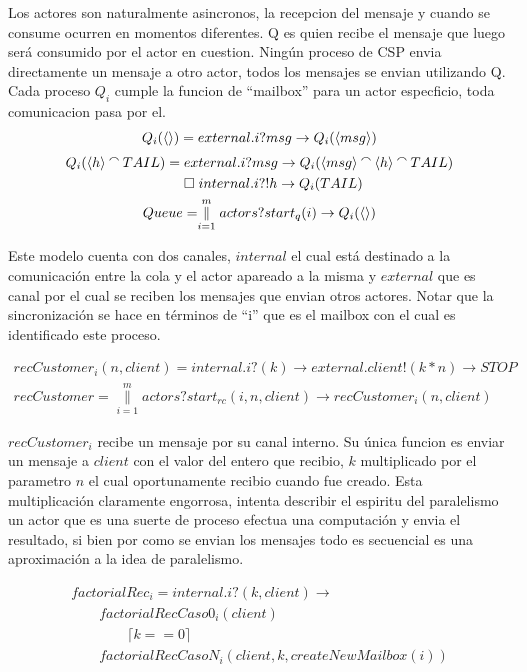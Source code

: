 \documentclass[fleqn]{article}
\newcommand{\myList}[1]{\langle #1 \rangle}
\newcommand{\myCons}[0]{\mathbin{\raise 0.8ex\hbox{$\smallfrown$}}}
\newcommand{\paralleln}[2]{\overset{#2}{\underset{i = #1}{\parallel}}}
\begin{document}
Los actores son naturalmente asincronos, la recepcion del mensaje y cuando se consume ocurren en momentos diferentes. Q es quien recibe el mensaje que luego será consumido por el actor en cuestion. Ningún proceso de CSP envia directamente un mensaje a otro actor, todos los mensajes se envian utilizando Q. Cada proceso $Q_i$ cumple la funcion de ``mailbox'' para un actor especficio, toda comunicacion pasa por el. \\

\begin{gather*}
Q_i(\myList{}) = external.i?msg \rightarrow Q_i(\myList{msg}) \\
Q_i(\myList{h} \myCons TAIL) = external.i?msg \rightarrow Q_i(\myList{msg} \myCons \myList{h} \myCons TAIL) \\ 
\qquad \square \; internal.i?!h \rightarrow Q_i(TAIL) \\  
Queue = \paralleln{1}{m} actors?start_q(i) \rightarrow Q_i(\myList{})
\end{gather*}

Este modelo cuenta con dos canales, $internal$ el cual está destinado a la comunicación entre la cola y el actor apareado a la misma y $external$ que es canal por el cual se reciben los mensajes que envian otros actores. Notar que la sincronización se hace en términos de ``i'' que es el mailbox con el cual es identificado este proceso.

\begin{gather*}
recCustomer_i(n, client) = internal.i?(k) \rightarrow external.client!(k*n) \rightarrow STOP \\
recCustomer = \paralleln{1}{m} actors?start_{rc}(i, n, client) \rightarrow recCustomer_i(n, client)
\end{gather*}

$recCustomer_i$ recibe un mensaje por su canal interno. Su única funcion es enviar un mensaje a $client$ con el valor del entero que recibio, $k$ multiplicado por el parametro $n$ el cual oportunamente recibio cuando fue creado. Esta multiplicación claramente engorrosa, intenta describir el espiritu del paralelismo un actor que es una suerte de proceso efectua una computación y envia el resultado, si bien por como se envian los mensajes todo es secuencial es una aproximación a la idea de paralelismo.

\begin{gather*}
factorialRec_i = internal.i?(k,client) \rightarrow \\
\qquad factorialRecCaso0_i(client) \\
\qquad \qquad \lceil k == 0 \rceil \\
\qquad factorialRecCasoN_i(client, k, createNewMailbox(i))
\end{gather*}
\end{document}
